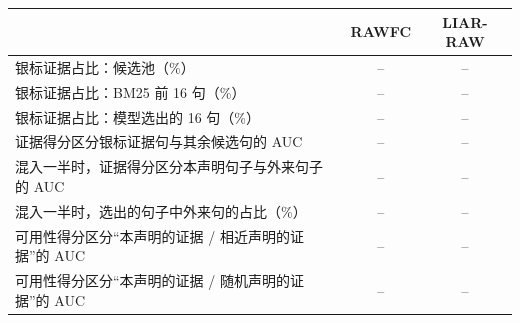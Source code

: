 \begin{tabular}{lcc}
\toprule
 & RAWFC & LIAR-RAW \\
\midrule
银标证据占比：候选池（\%） & -- & -- \\
银标证据占比：BM25 前 16 句（\%） & -- & -- \\
银标证据占比：模型选出的 16 句（\%） & -- & -- \\
证据得分区分银标证据句与其余候选句的 AUC & -- & -- \\
混入一半时，证据得分区分本声明句子与外来句子的 AUC & -- & -- \\
混入一半时，选出的句子中外来句的占比（\%） & -- & -- \\
可用性得分区分“本声明的证据 / 相近声明的证据”的 AUC & -- & -- \\
可用性得分区分“本声明的证据 / 随机声明的证据”的 AUC & -- & -- \\
\bottomrule
\end{tabular}
